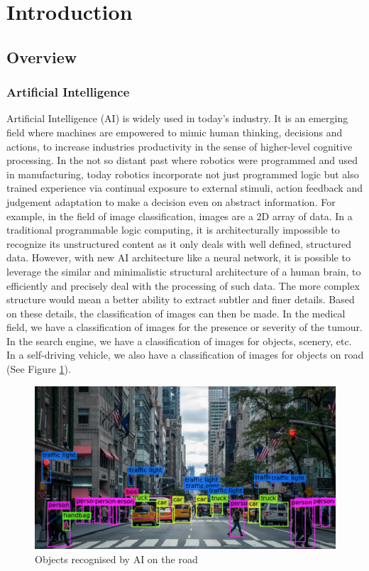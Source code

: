 \setcounter{page}{1}
\section{Introduction}
\subsection{Overview}
\subsubsection{Artificial Intelligence}
Artificial Intelligence (AI) is widely used in today's industry. It is an emerging field where machines are empowered to mimic human thinking, decisions and actions, to increase industries productivity in the sense of higher-level cognitive processing. In the not so distant past where robotics were programmed and used in manufacturing, today robotics incorporate not just programmed logic but also trained experience via continual exposure to external stimuli, action feedback and judgement adaptation to make a decision even on abstract information. For example, in the field of image classification, images are a 2D array of data. In a traditional programmable logic computing, it is architecturally impossible to recognize its unstructured content as it only deals with well defined, structured data. However, with new AI architecture like a neural network, it is possible to leverage the similar and minimalistic structural architecture of a human brain, to efficiently and precisely deal with the processing of such data. The more complex structure would mean a better ability to extract subtler and finer details. Based on these details, the classification of images can then be made. In the medical field, we have a classification of images for the presence or severity of the tumour. In the search engine, we have a classification of images for objects, scenery, etc. In a self-driving vehicle, we also have a classification of images for objects on road (See Figure \ref{fig:cvroad}).
\begin{figure}[H]
	\centering
	\includegraphics[scale=0.4]{cvroad.png}
	\caption{Objects recognised by AI on the road \cite{cvroad}}
	\label{fig:cvroad}
\end{figure}


